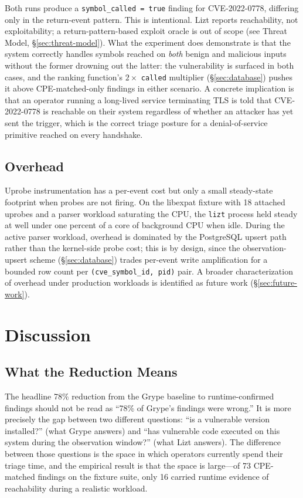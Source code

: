 \documentclass[conference]{IEEEtran}
\begin{document}
Both runs produce a \texttt{symbol\_called~=~true} finding for CVE-2022-0778, differing only in the return-event pattern. This is intentional. Lizt reports reachability, not exploitability; a return-pattern-based exploit oracle is out of scope (see Threat Model, \S\ref{sec:threat-model}). What the experiment does demonstrate is that the system correctly handles symbols reached on \emph{both} benign and malicious inputs without the former drowning out the latter: the vulnerability is surfaced in both cases, and the ranking function's $2\times$ \texttt{called} multiplier (\S\ref{sec:database}) pushes it above CPE-matched-only findings in either scenario. A concrete implication is that an operator running a long-lived service terminating TLS is told that CVE-2022-0778 is reachable on their system regardless of whether an attacker has yet sent the trigger, which is the correct triage posture for a denial-of-service primitive reached on every handshake.

\subsection{Overhead}

Uprobe instrumentation has a per-event cost but only a small steady-state footprint when probes are not firing. On the libexpat fixture with 18 attached uprobes and a parser workload saturating the CPU, the \texttt{lizt} process held steady at well under one percent of a core of background CPU when idle. During the active parser workload, overhead is dominated by the PostgreSQL upsert path rather than the kernel-side probe cost; this is by design, since the observation-upsert scheme (\S\ref{sec:database}) trades per-event write amplification for a bounded row count per \texttt{(cve\_symbol\_id, pid)} pair. A broader characterization of overhead under production workloads is identified as future work (\S\ref{sec:future-work}).


\section{Discussion}

\subsection{What the Reduction Means}

The headline 78\% reduction from the Grype baseline to runtime-confirmed findings should not be read as ``78\% of Grype's findings were wrong.'' It is more precisely the gap between two different questions: ``is a vulnerable version installed?'' (what Grype answers) and ``has vulnerable code executed on this system during the observation window?'' (what Lizt answers). The difference between those questions is the space in which operators currently spend their triage time, and the empirical result is that the space is large---of 73 CPE-matched findings on the fixture suite, only 16 carried runtime evidence of reachability during a realistic workload.
\end{document}
